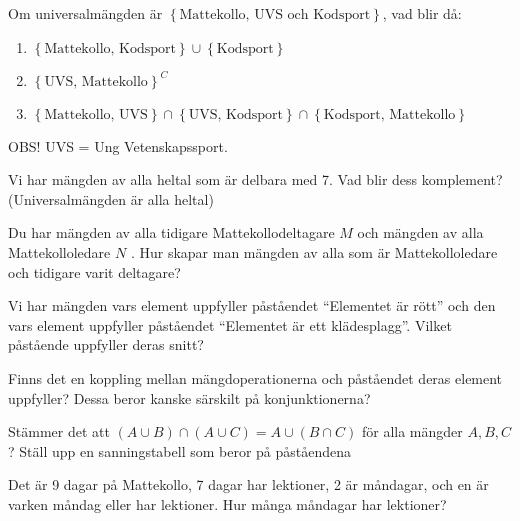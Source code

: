 \begin{problem}
	Om universalmängden är \(\left\{\text{Mattekollo, UVS och Kodsport} \right\}\), vad blir då:
	\begin{enumerate}[label=\alph*)]
		\item \(\left\{\text{Mattekollo, Kodsport} \right\} \cup \left\{\text{Kodsport} \right\}\) 
		\item \(\left\{\text{UVS, Mattekollo}\right\}^C\) 
		\item \(\left\{\text{Mattekollo, UVS}\right\} \cap \left\{\text{UVS, Kodsport} \right\} \cap \left\{\text{Kodsport, Mattekollo} \right\}\) 
	\end{enumerate}
	
	OBS! UVS = Ung Vetenskapssport.
\end{problem}

\begin{problem}
	Vi har mängden av alla heltal som är delbara med 7. Vad blir dess komplement? (Universalmängden är alla heltal)
\end{problem}

\begin{problem}
	Du har mängden av alla tidigare Mattekollodeltagare \(M\)  och mängden av alla Mattekolloledare \(N\) . Hur skapar man mängden av alla som är Mattekolloledare och tidigare varit deltagare?
\end{problem}

\begin{problem}
	Vi har mängden vars element uppfyller påståendet ``Elementet är rött'' och den vars element uppfyller påståendet ``Elementet är ett klädesplagg''. Vilket påstående uppfyller deras snitt?
\end{problem}

\begin{problem}
	Finns det en koppling mellan mängdoperationerna och påståendet deras element uppfyller? Dessa beror kanske särskilt på konjunktionerna?
\end{problem}

\begin{problem}
	Stämmer det att \((A \cup B) \cap (A \cup C) = A \cup (B \cap C)\) för alla mängder \(A, B, C\)? Ställ upp en sanningstabell som beror på påståendena \(\)
\end{problem}

\begin{problem}[Extra]
	Det är 9 dagar på Mattekollo, 7 dagar har lektioner, 2 är måndagar, och en är varken måndag eller har lektioner. Hur många måndagar har lektioner?
\end{problem}


